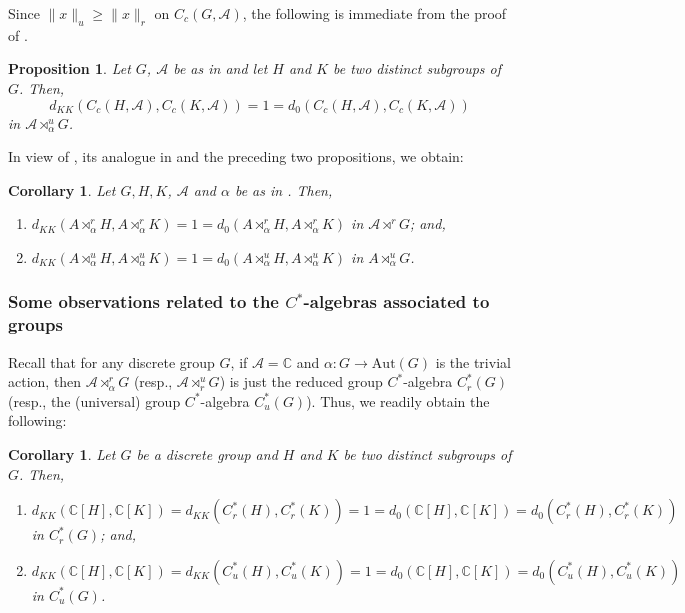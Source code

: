 \documentclass{amsart}
\numberwithin{equation}{section}
\newcommand{\C}{\mathbb C}
\newcommand{\1}{\mathbf{1}}
\newcommand{\mA}{\mathcal{A}}
\newtheorem{cor}[theorem]{Corollary}
\newtheorem{proposition}[theorem]{Proposition}
\begin{document}
Since $\|x\|_u \geq \|x\|_r$ on $C_c(G, \mA)$, the following is immediate from the proof of .
\begin{proposition}\label{Cc-HA-Cc-KA-distance-universal}\label{d0-distance-universal}
Let $G$, $\mA$ be as in  and let $H$ and $K$ be
two distinct subgroups of $G$. Then,
  \[
  d_{KK}(C_c(H, \mA),C_c(K, \mA))=1 =   d_{0}(C_c(H, \mA),C_c(K, \mA))
  \]
in $\mA \rtimes^u_{\alpha} G$.
\end{proposition}

In view of , its analogue in  and
the preceding two propositions, we obtain:
\begin{cor}\label{distances-crossed-product-subalgebras}
  Let $G, H, K$, $\mA$ and $\alpha$ be as in . Then,
\begin{enumerate}
\item $d_{KK}(A\rtimes^r_{\alpha}H, A\rtimes^r_{\alpha}K)=1 = d_{0}(A\rtimes^r_{\alpha}H, A\rtimes^r_{\alpha}K)$ in $\mA \rtimes^r G$; and,
\item $d_{KK}(A\rtimes^u_{\alpha}H, A\rtimes^u_{\alpha}K)=1 = d_{0}(A\rtimes^u_{\alpha}H, A\rtimes^u_{\alpha}K) $ in  $A\rtimes^u_{\alpha}G$.
\end{enumerate}
\end{cor}


\subsubsection{Some observations related to the $C^*$-algebras associated to groups}

Recall that for any discrete group $G$, if $\mA =\C$ and $\alpha: G
\to \mathrm{Aut}(G)$ is the trivial action, then $\mA
\rtimes^r_{\alpha} G$ (resp., $\mA \rtimes^u_r G$) is just the reduced
group $C^*$-algebra $C^*_r(G)$ (resp., the (universal) group
$C^*$-algebra $C^*_u(G)$). Thus, we readily obtain the following:

\begin{cor}\label{d-CH-CK}\label{dKK-d0-group-algebras}
Let $G$ be a discrete group and $H$ and $K$ be two distinct subgroups of $G$. Then,
\begin{enumerate}
\item $d_{KK}(\C[H], \C[K]) = d_{KK}(C^*_r(H), C^*_r(K)) = 1 =  d_{0}(\C[H], \C[K]) = d_{0}(C^*_r(H), C^*_r(K)) $ in $C^*_r(G)$; and, 
\item $d_{KK}(\C[H], \C[K]) = d_{KK}(C^*_u(H), C^*_u(K)) = 1 = d_{0}(\C[H], \C[K]) = d_{0}(C^*_u(H), C^*_u(K)) $ in $C^*_u(G)$. 
\end{enumerate}
\end{cor}
\end{document}
